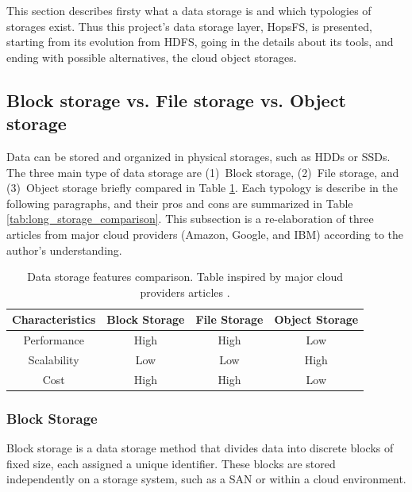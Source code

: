 This section describes firsty what a data storage is and which typologies of storages exist. Thus this project's data storage layer, \gls{HopsFS}, is presented, starting from its evolution from \gls{HDFS}, going in the details about its tools, and ending with possible alternatives, the cloud object storages.

\subsection{Block storage vs. File storage vs. Object storage}
\label{subsec:block_vs_file_vs_object}

Data can be stored and organized in physical storages, such as \glspl{HDD} or \glspl{SSD}. The three main type of data storage are (1)~Block storage, (2)~File storage, and (3)~Object storage briefly compared in Table \ref{tab:short_storage_comparison}. Each typology is describe in the following paragraphs, and their pros and cons are summarized in Table \ref{tab:long_storage_comparison}. This subsection is a re-elaboration of three articles from major cloud providers (Amazon, Google, and IBM) \cite{BlockVsFile, HowObjectVs, ObjectVsFile2021} according to the author's understanding.

\begin{table}[!ht]
    \begin{center}
      \caption[Data storage features comparison]{Data storage features comparison. Table inspired by major cloud providers articles \cite{BlockVsFile,HowObjectVs,ObjectVsFile2021}.}
      \label{tab:short_storage_comparison}
      \begin{tabular}{cccc}
        \toprule
        \textbf{Characteristics} & \textbf{Block Storage} & \textbf{File Storage} & \textbf{Object Storage}\\
        \midrule
        Performance & High & High & Low\\
        Scalability & Low & Low & High\\
        Cost & High & High & Low\\
        \bottomrule
      \end{tabular}
    \end{center}
\end{table}

\subsubsection*{Block Storage}

Block storage is a data storage method that divides data into discrete blocks of fixed size, each assigned a unique identifier. These blocks are stored independently on a storage system, such as a \gls{SAN} or within a cloud environment. 


